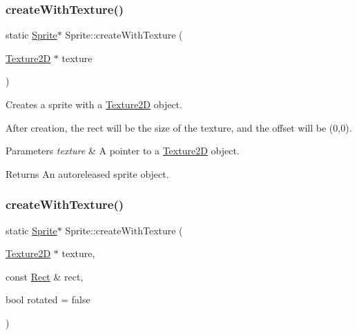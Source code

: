 \subsubsection{\texorpdfstring{create\+With\+Texture()}{createWithTexture()}\hspace{0.1cm}{\footnotesize\ttfamily [3/4]}}
{\footnotesize\ttfamily static \hyperlink{classSprite}{Sprite}$\ast$ Sprite\+::create\+With\+Texture (\begin{DoxyParamCaption}\item[{\hyperlink{classTexture2D}{Texture2D} $\ast$}]{texture }\end{DoxyParamCaption})\hspace{0.3cm}{\ttfamily [static]}}

Creates a sprite with a \hyperlink{classTexture2D}{Texture2D} object.

After creation, the rect will be the size of the texture, and the offset will be (0,0).


\begin{DoxyParams}{Parameters}
{\em texture} & A pointer to a \hyperlink{classTexture2D}{Texture2D} object. \\
\hline
\end{DoxyParams}
\begin{DoxyReturn}{Returns}
An autoreleased sprite object. 
\end{DoxyReturn}
\mbox{\label{classSprite_a991657deed52a1dda260e0c1e42859e5}} 
\subsubsection{\texorpdfstring{create\+With\+Texture()}{createWithTexture()}\hspace{0.1cm}{\footnotesize\ttfamily [4/4]}}
{\footnotesize\ttfamily static \hyperlink{classSprite}{Sprite}$\ast$ Sprite\+::create\+With\+Texture (\begin{DoxyParamCaption}\item[{\hyperlink{classTexture2D}{Texture2D} $\ast$}]{texture,  }\item[{const \hyperlink{classRect}{Rect} \&}]{rect,  }\item[{bool}]{rotated = {\ttfamily false} }\end{DoxyParamCaption})\hspace{0.3cm}{\ttfamily [static]}}

